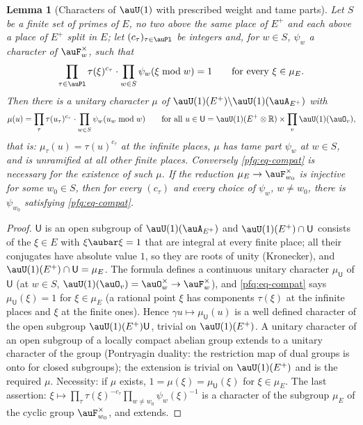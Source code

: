 \documentclass[10pt]{amsart}
\newtheorem{lemma}[theorem]{Lemma}
\theoremstyle{definition}
\theoremstyle{remark}
\newcommand{\R}{\mathbb R}
\begin{document}
\begin{lemma}[Characters of $\auU(1)$ with prescribed weight and tame parts]\label{pfq:mu}
Let $S$ be a finite set of primes of $E$, no two above the same place of $E^+$ and each above a place of $E^+$ split in $E$; let
$(c_\tau)_{\tau\in\auPl}$ be integers and, for $w\in S$, $\psi_w$ a character of $\auF_w^\times$, such that
\begin{equation}\label{pfq:eq-compat}
\prod_{\tau\in\auPl}\tau(\xi)^{c_\tau}\cdot\prod_{w\in S}\psi_w(\xi\bmod w)=1\qquad\text{for every }\xi\in\mu_E .
\end{equation}
Then there is a unitary character $\mu$ of $\auU(1)(E^+)\backslash\auU(1)(\auA_{E^+})$ with
\[
\mu(u)=\prod_\tau\tau(u_\tau)^{c_\tau}\cdot\prod_{w\in S}\psi_w(u_w\bmod w)\qquad\text{for all }u\in\mathsf U=\auU(1)(E^+\otimes\R)\times\prod_v
\auU(1)(\auO_v),
\]
that is: $\mu_\tau(u)=\tau(u)^{c_\tau}$ at the infinite places, $\mu$ has tame part $\psi_w$ at $w\in S$, and is unramified at all
other finite places. Conversely \eqref{pfq:eq-compat} is necessary for the existence of such $\mu$. If the reduction
$\mu_E\to\auF_{w_0}^\times$ is injective for some $w_0\in S$, then for every $(c_\tau)$ and every choice of $\psi_w$, $w\ne w_0$, there is $\psi_{w_0}$ satisfying \eqref{pfq:eq-compat}.
\end{lemma}
\begin{proof}
$\mathsf U$ is an open subgroup of $\auU(1)(\auA_{E^+})$ and $\auU(1)(E^+)\cap\mathsf U$ consists of the $\xi\in E$ with $\xi\aubar\xi=1$
that are integral at every finite place; all their conjugates have absolute value $1$, so they are roots of unity (Kronecker), and
$\auU(1)(E^+)\cap\mathsf U=\mu_E$. The formula defines a continuous unitary character $\mu_{\mathsf U}$ of $\mathsf U$ (at $w\in S$,
$\auU(1)(\auO_v)=\auO_w^\times\to\auF_w^\times$), and \eqref{pfq:eq-compat} says $\mu_{\mathsf U}(\xi)=1$ for $\xi\in\mu_E$ (a rational point
$\xi$ has components $\tau(\xi)$ at the infinite places and $\xi$ at the finite ones). Hence $\gamma u\mapsto\mu_{\mathsf U}(u)$ is a
well defined character of the open subgroup $\auU(1)(E^+)\mathsf U$, trivial on $\auU(1)(E^+)$. A unitary character of an open
subgroup of a locally compact abelian group extends to a unitary character of the group (Pontryagin duality: the restriction map
of dual groups is onto for closed subgroups); the extension is trivial on $\auU(1)(E^+)$ and is the required $\mu$. Necessity: if
$\mu$ exists, $1=\mu(\xi)=\mu_{\mathsf U}(\xi)$ for $\xi\in\mu_E$. The last assertion: $\xi\mapsto\prod_\tau\tau(\xi)^{-c_\tau}\prod_{w\ne w_0}
\psi_w(\xi)^{-1}$ is a character of the subgroup $\mu_E$ of the cyclic group $\auF_{w_0}^\times$, and extends.
\end{proof}
\end{document}
